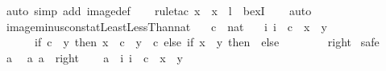 \begin{isabellebody}
\isamarkupfalse%
\ {\isacharparenleft}{\kern0pt}auto\ simp\ add{\isacharcolon}{\kern0pt}\ image{\isacharunderscore}{\kern0pt}def{\isacharparenright}{\kern0pt}\isanewline
\ \ \isamarkupfalse%
\ {\isacharparenleft}{\kern0pt}rule{\isacharunderscore}{\kern0pt}tac\ x\ {\isacharequal}{\kern0pt}\ {\isachardoublequoteopen}x\ {\isacharminus}{\kern0pt}\ l{\isachardoublequoteclose}\ \ bexI{\isacharparenright}{\kern0pt}\isanewline
\ \ \isamarkupfalse%
\ auto\isanewline
\ \ \isamarkupfalse%
%
\endisatagproof
{\isafoldproof}%
%
\isadelimproof
\isanewline
%
\endisadelimproof
\isanewline
{}\isamarkupfalse%
\ image{\isacharunderscore}{\kern0pt}minus{\isacharunderscore}{\kern0pt}const{\isacharunderscore}{\kern0pt}atLeastLessThan{\isacharunderscore}{\kern0pt}nat{\isacharcolon}{\kern0pt}\isanewline
\ \ \ c\ {\isacharcolon}{\kern0pt}{\isacharcolon}{\kern0pt}\ nat\isanewline
\ \ \ {\isachardoublequoteopen}{\isacharparenleft}{\kern0pt}{\isasymlambda}i{\isachardot}{\kern0pt}\ i\ {\isacharminus}{\kern0pt}\ c{\isacharparenright}{\kern0pt}\ {\isacharbackquote}{\kern0pt}\ {\isacharbraceleft}{\kern0pt}x\ {\isachardot}{\kern0pt}{\isachardot}{\kern0pt}{\isacharless}{\kern0pt}\ y{\isacharbraceright}{\kern0pt}\ {\isacharequal}{\kern0pt}\isanewline
\ \ \ \ \ \ {\isacharparenleft}{\kern0pt}if\ c\ {\isacharless}{\kern0pt}\ y\ then\ {\isacharbraceleft}{\kern0pt}x\ {\isacharminus}{\kern0pt}\ c\ {\isachardot}{\kern0pt}{\isachardot}{\kern0pt}{\isacharless}{\kern0pt}\ y\ {\isacharminus}{\kern0pt}\ c{\isacharbraceright}{\kern0pt}\ else\ if\ x\ {\isacharless}{\kern0pt}\ y\ then\ {\isacharbraceleft}{\kern0pt}{}{\isacharbraceright}{\kern0pt}\ else\ {\isacharbraceleft}{\kern0pt}{\isacharbraceright}{\kern0pt}{\isacharparenright}{\kern0pt}{\isachardoublequoteclose}\isanewline
\ \ \ \ {\isacharparenleft}{\kern0pt}\ {\isachardoublequoteopen}{\isacharunderscore}{\kern0pt}\ {\isacharequal}{\kern0pt}\ {\isacharquery}{\kern0pt}right{\isachardoublequoteclose}{\isacharparenright}{\kern0pt}\isanewline
%
\isadelimproof
%
\endisadelimproof
%
\isatagproof
{}\isamarkupfalse%
\ safe\isanewline
\ \ \isamarkupfalse%
\ a\ \isamarkupfalse%
\ a{\isacharcolon}{\kern0pt}\ {\isachardoublequoteopen}a\ {\isasymin}\ {\isacharquery}{\kern0pt}right{\isachardoublequoteclose}\isanewline
\ \ \isamarkupfalse%
\ {\isachardoublequoteopen}a\ {\isasymin}\ {\isacharparenleft}{\kern0pt}{\isasymlambda}i{\isachardot}{\kern0pt}\ i\ {\isacharminus}{\kern0pt}\ c{\isacharparenright}{\kern0pt}\ {\isacharbackquote}{\kern0pt}\ {\isacharbraceleft}{\kern0pt}x\ {\isachardot}{\kern0pt}{\isachardot}{\kern0pt}{\isacharless}{\kern0pt}\ y{\isacharbraceright}{\kern0pt}{\isachardoublequoteclose}\isanewline

\end{isabellebody}
